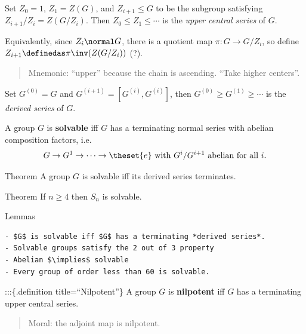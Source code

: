 \begin{definition}

Set \(Z_0 = 1\), \(Z_1 = Z(G)\), and \(Z_{i+1} \leq G\) to be the
subgroup satisfying \(Z_{i+1}/Z_i = Z(G/Z_i)\). Then
\(Z_0 \leq Z_1 \leq \cdots\) is the \emph{upper central series} of
\(G\).

Equivalently, since \(Z_i\normal G\), there is a quotient map
\(\pi:G\to G/Z_i\), so define \(Z_{i+1} \definedas \pi\inv(Z(G/Z_i))\)
(?).

\begin{quote}
Mnemonic: ``upper'' because the chain is ascending. ``Take higher
centers''.
\end{quote}

\end{definition}

\begin{definition}

Set \(G^{(0)} = G\) and \(G^{(i+1)} = [G^{(i)}, G^{(i)}]\), then
\(G^{(0)} \geq G^{(1)} \geq \cdots\) is the \emph{derived series} of
\(G\).

\end{definition}

\begin{definition}[Solvable]

A group \(G\) is \textbf{solvable} iff \(G\) has a terminating normal
series with abelian composition factors, i.e.
\begin{align*}
  G \to G^1 \to \cdots \to \theset{e} \text{ with } G^{i}/G^{i+1}\text{ abelian for all } i
  .\end{align*}

\end{definition}

Theorem A group \(G\) is solvable iff its derived series terminates.

Theorem If \(n\geq 4\) then \(S_n\) is solvable.

Lemmas \hfill

\begin{verbatim}
- $G$ is solvable iff $G$ has a terminating *derived series*.
- Solvable groups satisfy the 2 out of 3 property
- Abelian $\implies$ solvable
- Every group of order less than 60 is solvable.
\end{verbatim}

:::\{.definition title=``Nilpotent''\} A group \(G\) is
\textbf{nilpotent} iff \(G\) has a terminating upper central series.

\begin{quote}
Moral: the adjoint map is nilpotent.
\end{quote}


